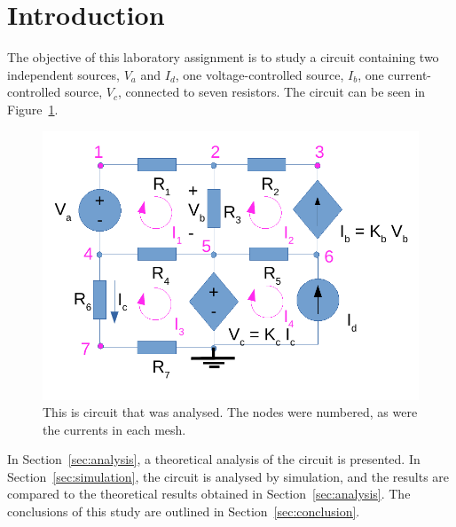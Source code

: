 \section{Introduction}
\label{sec:introduction}

The objective of this laboratory assignment is to study a circuit containing two independent sources, $V_a$ and $I_d$, one voltage-controlled source, $I_b$, one current-controlled source, $V_c$, connected to seven resistors. The circuit can be seen in Figure~\ref{fig1}.

\begin{figure}[h] \centering
\includegraphics[width=0.4\linewidth]{t1-1.pdf}
\caption{This is circuit that was analysed. The nodes were numbered, as were the currents in each mesh.}
\label{fig1}
\end{figure}

In Section~\ref{sec:analysis}, a theoretical analysis of the circuit is
presented. In Section~\ref{sec:simulation}, the circuit is analysed by
simulation, and the results are compared to the theoretical results obtained in
Section~\ref{sec:analysis}. The conclusions of this study are outlined in
Section~\ref{sec:conclusion}.